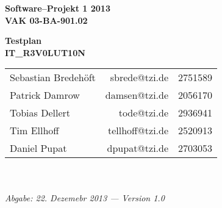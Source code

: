 \documentclass[fontsize=12pt,paper=a4,twoside]{scrartcl}
\begin{document}
  \thispagestyle{fancy}
  \fancyhead[LO,RE]{ }
  \fancyfoot[C]{}

  \vspace{3cm}

  \begin{minipage}[H]{\textwidth}
  \begin{center}
  \bf
  \Large
  Software--Projekt 1 2013\\
  \smallskip
  \small
  VAK 03-BA-901.02\\
  \vspace{3cm}
  \end{center}
  \end{minipage}
  \begin{minipage}[H]{\textwidth}
  \begin{center}
  \vspace{1cm}
  \bf
  \Large Testplan\\
  \vspace{3ex} \small IT\_R3V0LUT10N\\
  \vfill
  \end{center}
  \end{minipage}
  \vfill
  \begin{minipage}[H]{\textwidth}
  \begin{center}
  \sf
  \begin{tabular}{lrr}
 			Sebastian Bredehöft & sbrede@tzi.de & 2751589\\
 			Patrick Damrow & damsen@tzi.de & 2056170\\
 			Tobias Dellert & tode@tzi.de & 2936941\\
 			Tim Ellhoff & tellhoff@tzi.de & 2520913\\
 			Daniel Pupat & dpupat@tzi.de & 2703053\\
  \end{tabular}
  \\ ~
  \vspace{2cm}
  \\
  \it Abgabe: 22. Dezemebr 2013 --- Version 1.0\\ ~
  \end{center}
  \end{minipage}

\end{document}
